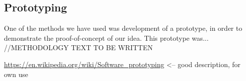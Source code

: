 \subsection{Prototyping}

One of the methods we have used was development of a prototype, in order to demonstrate the proof-of-concept of our idea. This prototype was... //METHODOLOGY TEXT TO BE WRITTEN

\url{https://en.wikipedia.org/wiki/Software_prototyping} <-- good description, for own use